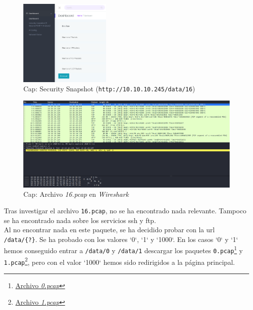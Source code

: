 \begin{figure}[h]
    \centering
    \includegraphics[width=0.40\textwidth]{images/machines/cap/web-sec-snapshots.png}
    \caption{Cap: Security Snapshot (\texttt{http://10.10.10.245/data/16})}
    \label{fig:cap-snapshot}
\end{figure}

\begin{figure}[h]
    \centering
    \includegraphics[width=1.0\textwidth]{images/machines/cap/wireshark-16.png}
    \caption{Cap: Archivo \textit{16.pcap} en \textit{Wireshark}}
    \label{fig:cap-wire-16}
\end{figure}

Tras investigar el archivo \texttt{16.pcap}, no se ha encontrado nada relevante. Tampoco se ha encontrado nada sobre los servicios \acrshort{ssh} y \acrshort{ftp}.\\

Al no encontrar nada en este paquete, se ha decidido probar con la \acrshort{url} \texttt{/data/\{?\}}. Se ha probado con los valores `0`, `1` y `1000`. En los casos `0` y `1` hemos conseguido entrar a \texttt{/data/0} y \texttt{/data/1} descargar los paquetes \texttt{0.pcap}\footnote{\href{https://github.com/VictorNS69/TFM/blob/main/machines/cap/pcaps/0.pcap}{Archivo \textit{0.pcap}}} y \texttt{1.pcap}\footnote{\href{https://github.com/VictorNS69/TFM/blob/main/machines/cap/pcaps/1.pcap}{Archivo \textit{1.pcap}}}, pero con el valor `1000` hemos sido redirigidos a la página principal.\\

